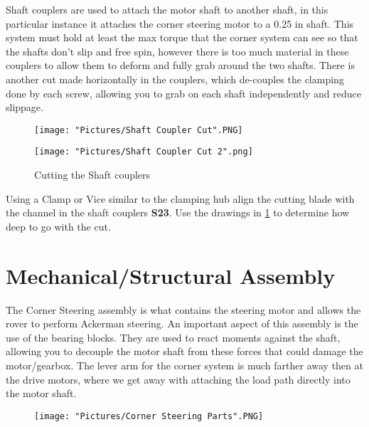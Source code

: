 \documentclass[12pt]{article}
\begin{document}
Shaft couplers are used to attach the motor shaft to another shaft, in this particular instance it attaches the corner steering motor to a 0.25 in shaft. This system must hold at least the max torque that the corner system can see so that the shafts don't slip and free spin, however there is too much material in these couplers to allow them to deform and fully grab around the two shafts. There is another cut made horizontally in the couplers, which de-couples the clamping done by each screw, allowing you to grab on each shaft independently and reduce slippage. 


\begin{figure}[H]
  	\centering
  	\begin{minipage}[b]{0.35\textwidth}
   		 \texttt{[image: "Pictures/Shaft Coupler Cut".PNG]}		
	\end{minipage}
 	 \hfill
 	 \begin{minipage}[b]{0.55\textwidth}
  		  \texttt{[image: "Pictures/Shaft Coupler Cut 2".png]}
  	\end{minipage}
 	 \caption{Cutting the Shaft couplers}
	\label{Shaft coupler cut}
\end{figure}

Using a Clamp or Vice similar to the clamping hub align the cutting blade with the channel in the shaft couplers \textbf{S23}. Use the drawings in \ref{Shaft coupler cut} to determine how deep to go with the cut.


\section{Mechanical/Structural Assembly} 
The Corner Steering assembly is what contains the steering motor and allows the rover to perform Ackerman steering. An important aspect of this assembly is the use of the bearing blocks. They are used to react moments against the shaft, allowing you to decouple the motor shaft from these forces that could damage the motor/gearbox. The lever arm for the corner system is much farther away then at the drive motors, where we get away with attaching the load path directly into the motor shaft.

\begin{figure}[H]
	\centering
	\texttt{[image: "Pictures/Corner Steering Parts".PNG]}
\end{figure}
\end{document}
